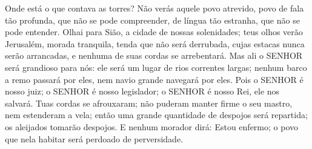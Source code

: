 { Onde está o que contava as torres?
  Não verás
{} aquele povo atrevido, povo de fala tão profunda, que não se pode compreender, de língua tão estranha, que não se pode entender.
  Olhai para Sião, a cidade de nossas solenidades; teus olhos verão Jerusalém, morada tranquila, tenda que não será derrubada, cujas estacas nunca serão arrancadas, e nenhuma de suas cordas se arrebentará.
  Mas ali o SENHOR será grandioso para nós: ele será um lugar de rios
{} correntes largas; nenhum barco a remo passará por eles, nem navio grande navegará por eles.
  Pois o SENHOR é nosso juiz; o SENHOR é nosso legislador; o SENHOR é nosso Rei, ele nos salvará.
  Tuas cordas se afrouxaram; não puderam manter firme o seu mastro, nem estenderam a vela; então uma grande quantidade de despojos
 será repartida;
{} os aleijados tomarão despojos.
  E nenhum morador dirá: Estou enfermo;
{} o povo que nela habitar será perdoado de
{} perversidade.
\par }

